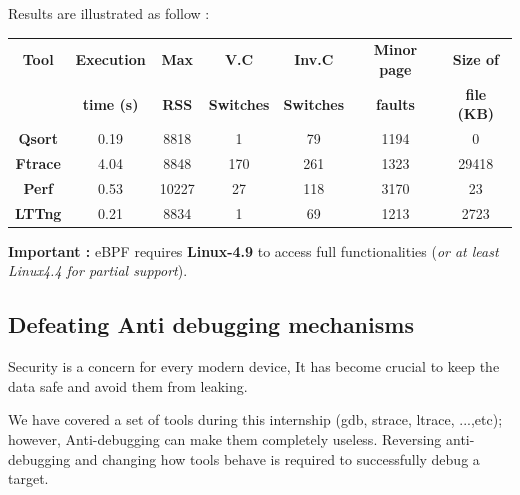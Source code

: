 Results are illustrated as follow :
						\begin{center}
							\begin{tabular}{|c|c|c|c|c|c|c|}
								\hline
								\rowcolor{LightCyan}
								\textbf{Tool} & \textbf{Execution} & \textbf{Max}  & \textbf{V.C} & \textbf{Inv.C} & \textbf{Minor page} & \textbf{Size of}\\
								\rowcolor{LightCyan}
							& 	\textbf{time (s)} & \textbf{RSS} & \textbf{Switches} & \textbf{Switches} & \textbf{faults} & \textbf{file (KB)} \\
								   	
								\hline
	    						\textbf{Qsort} & 0.19 & 8818 & 1 & 79 & 1194 &  0 \\								   		
   								\hline
	    						\textbf{Ftrace} & 4.04 & 8848 & 170 & 261 & 1323 & 29418  \\
								\hline     
        						
   								\textbf{Perf} & 0.53 & 10227 & 27 & 118 & 3170 & 23 \\
   								\hline
   								
   								\textbf{LTTng} & 0.21 & 8834 & 1 & 69 & 1213 & 2723 \\
   								\hline		
							\end{tabular}
						\end{center}


\textbf{\color{red}Important : } eBPF requires \textbf{Linux-4.9} to access full functionalities (\textit{or at least Linux4.4 for partial support}).

\subsection{Defeating Anti debugging mechanisms}
Security is a concern for every modern device, It has become crucial to keep the data safe and avoid them from leaking.\\

\begin{center}
\begin{mdframed}[
        linecolor=red,linewidth=2pt,%
        frametitlerule=true,%
        apptotikzsetting={\tikzset{mdfframetitlebackground/.append style={%
            shade,left color=white, right color=blue!20}}}, 
        frametitlerulecolor=blue,
        frametitlerulewidth=1pt, innertopmargin=\topskip,
        frametitle={Anti-debugging stops debugging tools},
        outerlinewidth=1.25pt
    ]
	We have covered a set of tools during this internship (gdb, strace, ltrace, ...,etc); however, Anti-debugging can make them completely useless. Reversing anti-debugging and changing how tools behave is required to successfully debug a target.\\

\end{mdframed}
\end{center}


